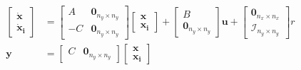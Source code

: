 \begin{align}
\begin{split}
\begin{bmatrix}
\dot{\mathbf{x}}\\
\mathbf{\dot{x}_i}
\end{bmatrix} & = \begin{bmatrix}
A & \mathbf{0_{\mathit{n_y}\times \mathit{n_y}}} \\
-C & \mathbf{0_{\mathit{n_y}\times \mathit{n_y}}}
\end{bmatrix}\begin{bmatrix}
\mathbf{x} \\
\mathbf{x_i}
\end{bmatrix} + \begin{bmatrix}
B \\ \mathbf{0_{\mathit{n_y}\times \mathit{n_y}}}
\end{bmatrix}\mathbf{u} +  \begin{bmatrix}
\mathbf{0_{\mathit{n_x}\times \mathit{n_x}}} \\
\mathcal{I}_{\mathit{n_y}\times \mathit{n_y}}
\end{bmatrix}r \\[5px]
\mathbf{y} & = \begin{bmatrix}
C & \mathbf{0_{\mathit{n_y}\times \mathit{n_y}}}
\end{bmatrix}\begin{bmatrix}
\mathbf{x} \\
\mathbf{x_i}
\end{bmatrix}
\end{split}
\end{align}


